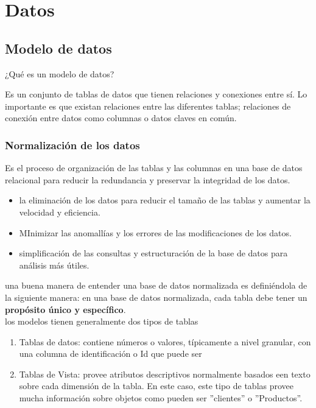 \chapter{Datos}


\section{Modelo de datos}


¿Qué es un modelo de datos?

Es un conjunto de tablas de datos que tienen relaciones y conexiones entre sí. Lo importante es que existan relaciones entre las diferentes tablas; relaciones de conexión entre datos como columnas o datos claves en común.

\subsection{Normalización de los datos}

Es el proceso de organización de las tablas y las columnas en una base de datos relacional para reducir la redundancia y preservar la integridad de los datos.

\begin{itemize}
    \item la eliminación de los datos para reducir el tamaño de las tablas y aumentar la velocidad y eficiencia.
    \item MInimizar las anomallías y los errores de las modificaciones de los datos.
    \item simplificación de las consultas y estructuración de la base de datos para análisis más útiles.
\end{itemize}

una buena manera de entender una base de datos normalizada es definiéndola de la siguiente manera: en una base de datos normalizada, cada tabla debe tener un \textbf{propósito único y específico}. \\

los modelos tienen generalmente dos tipos de tablas

\begin{enumerate}
    \item Tablas de datos: contiene números o valores, típicamente a nivel granular, con una columna de identificación o Id que puede ser
    \item Tablas de Vista: provee atributos descriptivos normalmente basados een texto sobre cada dimensión de la tabla. En este caso, este tipo de tablas provee mucha información sobre objetos como pueden ser ''clientes'' o ''Productos''.
\end{enumerate}

